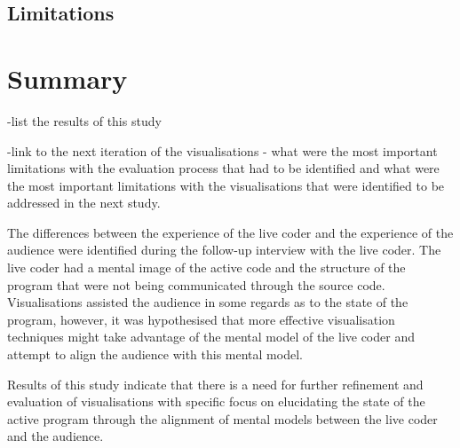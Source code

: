 \subsection{Limitations}

\more

\section{Summary}

-list the results of this study

-link to the next iteration of the visualisations - what were the most important limitations with the evaluation process that had to be identified and what were the most important limitations with the visualisations that were identified to be addressed in the next study.

The differences between the experience of the live coder and the experience of the audience were identified during the follow-up interview with the live coder. The live coder had a mental image of the active code and the structure of the program that were not being communicated through the source code. Visualisations assisted the audience in some regards as to the state of the program, however, it was hypothesised that more effective visualisation techniques might take advantage of the mental model of the live coder and attempt to align the audience with this mental model.

Results of this study indicate that there is a need for further refinement and evaluation of visualisations with specific focus on elucidating the state of the active program through the alignment of mental models between the live coder and the audience.




